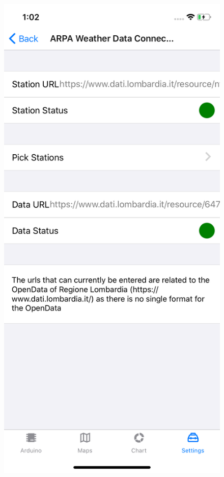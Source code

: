 \begin{figure}[H]
\centering
\includegraphics[height=.6\textheight]{./img/ui/arpa_settings.png}

\end{figure}
